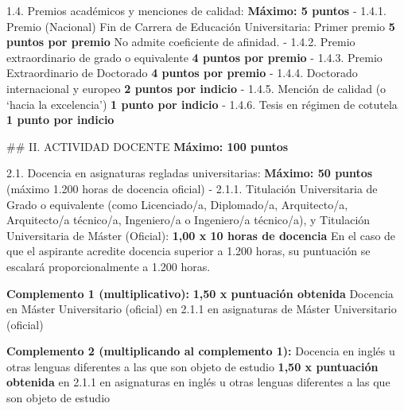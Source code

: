 \documentclass{article}
\begin{document}
\begin{itemize}
\begin{itemize}
\begin{scriptsize}
                  1.4. Premios académicos y menciones de calidad:                                           \textbf{Máximo: 5 puntos}
                  - 1.4.1. Premio (Nacional) Fin de Carrera de Educación Universitaria: Primer premio           \textbf{5 puntos por premio}           No admite coeficiente de afinidad.
                  - 1.4.2. Premio extraordinario de grado o equivalente        \textbf{4 puntos por premio}
                  - 1.4.3. Premio Extraordinario de Doctorado                  \textbf{4 puntos por premio}
                  - 1.4.4. Doctorado internacional y europeo                   \textbf{2 puntos por indicio}
                  - 1.4.5. Mención de calidad (o ‘hacia la excelencia’)        \textbf{1 punto por indicio}
                  - 1.4.6. Tesis en régimen de cotutela                        \textbf{1 punto por indicio}

                  \#\# II. ACTIVIDAD DOCENTE                                                                     \textbf{Máximo: 100 puntos}

                  2.1. Docencia en asignaturas regladas universitarias:                                     \textbf{Máximo: 50 puntos}
                  (máximo 1.200 horas de docencia oficial)
                  - 2.1.1. Titulación Universitaria de Grado o equivalente (como Licenciado/a, Diplomado/a, Arquitecto/a, Arquitecto/a técnico/a, Ingeniero/a o Ingeniero/a técnico/a), y Titulación Universitaria de Máster (Oficial):
                  \textbf{1,00 x 10 horas de docencia}
                  En el caso de que el aspirante acredite docencia superior a 1.200 horas, su puntuación se escalará proporcionalmente a 1.200 horas.

                  \textbf{Complemento 1 (multiplicativo):}                             \textbf{1,50 x puntuación obtenida}
                  Docencia en Máster Universitario (oficial)                  en 2.1.1 en asignaturas de Máster Universitario (oficial)

                  \textbf{Complemento 2 (multiplicando al complemento 1):}
                  Docencia en inglés u otras lenguas diferentes a las que son objeto de estudio                                      \textbf{1,50 x puntuación obtenida}
                  en 2.1.1 en asignaturas en inglés u otras lenguas diferentes a las que son objeto de estudio


\end{scriptsize}
\end{itemize}
\end{itemize}
\end{document}
